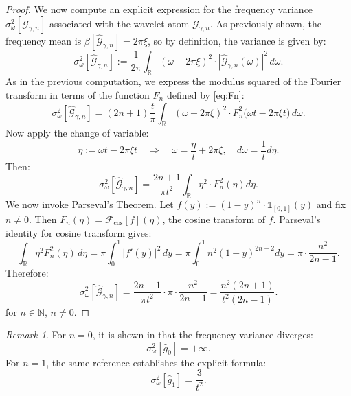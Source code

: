 \documentclass[preprint,hidelinks,authoryear]{elsarticle}
\theoremstyle{plain}
\theoremstyle{definition}
\theoremstyle{remark}
\newtheorem{remark}[theorem]{Remark}
\begin{document}
\begin{proof}
We now compute an explicit expression for the frequency variance $ \sigma_\omega^2[\hat{\mathcal{G}}_{\gamma,n}] $ associated with the wavelet atom $ \mathcal{G}_{\gamma,n} $. As previously shown, the frequency mean is $ \beta[\hat{\mathcal{G}}_{\gamma,n}] =2\pi \xi $, so by definition, the variance is given by:
$$
\sigma_\omega^2[\hat{\mathcal{G}}_{\gamma,n}] 
:= \frac{1}{2\pi} \int_{\mathbb{R}} (\omega - 2\pi \xi)^2 \cdot |\hat{\mathcal{G}}_{\gamma,n}(\omega)|^2 \, d\omega.
$$
As in the previous computation, we express the modulus squared of the Fourier transform in terms of the function $F_n$ defined by \eqref{eq:Fn}:
$$
\sigma_\omega^2[\hat{\mathcal{G}}_{\gamma,n}]
= (2n+1) \frac{t}{\pi} \int_{\mathbb{R}} (\omega - 2\pi \xi)^2 \cdot F_n^2\big( \omega t-2\pi \xi t \big) \, d\omega.
$$
Now apply the change of variable:
$$
\eta := \omega t-2\pi \xi t  \quad \Rightarrow \quad \omega = \frac{\eta}{t} + 2\pi \xi , \quad d\omega = \frac{1}{t} d\eta.
$$
Then:
$$
\sigma_\omega^2[\hat{\mathcal{G}}_{\gamma,n}]
= \frac{2n+1}{\pi t^2} \int_{\mathbb{R}} \eta ^2 \cdot F_n^2(\eta)  d\eta.
$$
We now invoke Parseval's Theorem. Let $ f(y) := (1 - y)^n \cdot \mathds{1}_{[0,1]}(y) $ and fix $n\neq 0$. Then %
$ F_n(\eta) = \mathcal{F}_{\cos}[f](\eta) $, the cosine transform of $ f $. Parseval’s identity for cosine transform gives:
$$
\int_{\mathbb{R}} \eta^2 F_n^2(\eta) \, d\eta = \pi \int_0^1 |f'(y)|^2 \, dy = \pi \int_0^1 n^2 (1 - y)^{2n - 2} dy = \pi \cdot \frac{n^2}{2n - 1}.
$$
Therefore:
$$
\sigma_\omega^2[\hat{\mathcal{G}}_{\gamma,n}]
=  \frac{2n+1}{\pi t^2} \cdot \pi \cdot \frac{n^2}{2n - 1}
=\frac{n^2 (2n + 1)}{t^2 (2n - 1)} .
$$
for $n\in \mathbb N$, $n\neq 0$.


\end{proof}

\begin{remark}
For $ n = 0 $, it is shown in \cite{mazzoccoli2024refining} that the frequency variance diverges:
\begin{equation}
\sigma_{\omega}^2[\hat{g}_0] = +\infty.
\label{formulavarianzafrequenzag0}
\end{equation}
For $ n = 1 $, the same reference establishes the explicit formula:
\begin{equation}
\sigma_{\omega}^2[\hat{g}_1] = \frac{3}{t^2}.
\label{formulavarianzafrequenzag1}
\end{equation}
\end{remark}
\end{document}
